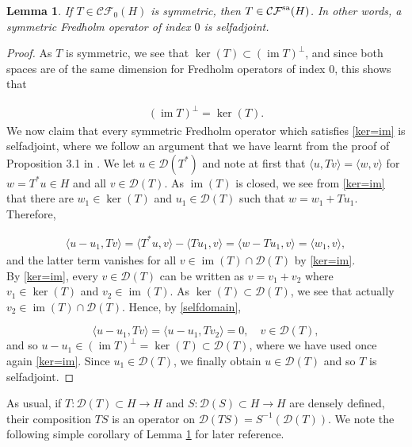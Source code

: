 \documentclass[a4paper,10pt]{article}
\newtheorem{lemma}[theorem]{Lemma}
\DeclareMathOperator{\im}{im}
\begin{document}
\begin{lemma}\label{symmetric-selfadjoint}
If $T\in\mathcal{CF}_0(H)$ is symmetric, then $T\in\mathcal{CF}^\textup{sa}(H)$. In other words, a symmetric Fredholm operator of index $0$ is selfadjoint. 
\end{lemma}


\begin{proof}
As $T$ is symmetric, we see that $\ker(T)\subset(\im T)^\perp$, and since both spaces are of the same dimension for Fredholm operators of index $0$, this shows that

\begin{align}\label{ker=im}
(\im T)^\perp=\ker(T).
\end{align}  
We now claim that every symmetric Fredholm operator which satisfies \eqref{ker=im} is selfadjoint, where we follow an argument that we have learnt from the proof of Proposition 3.1 in \cite{SalamonWehrheim}. We let $u\in\mathcal{D}(T^\ast)$ and note at first that $\langle u,T v\rangle=\langle w,v\rangle$ for $w=T^\ast u\in H$ and all $v\in\mathcal{D}(T)$. As $\im(T)$ is closed, we see from \eqref{ker=im} that there are $w_1\in\ker(T)$ and $u_1\in\mathcal{D}(T)$ such that $w=w_1+Tu_1$. Therefore,

\begin{align}\label{selfdomain}
\langle u-u_1,Tv\rangle=\langle T^\ast u,v\rangle-\langle Tu_1,v\rangle=\langle w-T u_1,v\rangle=\langle w_1,v\rangle,
\end{align}
and the latter term vanishes for all $v\in\im(T)\cap\mathcal{\mathcal{D}}(T)$ by \eqref{ker=im}.\\
By \eqref{ker=im}, every $v\in\mathcal{D}(T)$ can be written as $v=v_1+v_2$ where $v_1\in\ker(T)$ and $v_2\in\im(T)$. As $\ker(T)\subset\mathcal{D}(T)$, we see that actually $v_2\in \im(T)\cap\mathcal{D}(T)$. Hence, by \eqref{selfdomain},

\[\langle u-u_1,Tv\rangle=\langle u-u_1,Tv_2\rangle=0,\quad v\in\mathcal{D}(T),\]
and so $u-u_1\in(\im T)^\perp=\ker(T)\subset\mathcal{D}(T)$, where we have used once again \eqref{ker=im}. Since $u_1\in\mathcal{D}(T)$, we finally obtain $u\in\mathcal{D}(T)$ and so $T$ is selfadjoint.
\end{proof}
\noindent
As usual, if $T:\mathcal{D}(T)\subset H\rightarrow H$ and $S:\mathcal{D}(S)\subset H\rightarrow H$ are densely defined, their composition $TS$ is an operator on $\mathcal{D}(TS)=S^{-1}(\mathcal{D}(T))$. We note the following simple corollary of Lemma \ref{symmetric-selfadjoint} for later reference.
\end{document}
